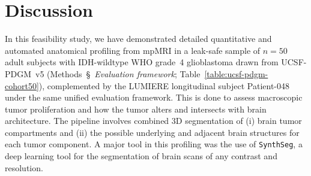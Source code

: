 \documentclass[a4paper,11pt,leqno]{article}
\begin{document}
\vspace{2mm}


\section{Discussion}


In this feasibility study, we have demonstrated detailed quantitative and automated anatomical profiling
from mpMRI in a leak-safe sample of $n=50$ adult subjects with
IDH-wildtype WHO grade~4 glioblastoma drawn from UCSF-PDGM~v5
(Methods~\S~\emph{Evaluation framework};
Table~\ref{table:ucsf-pdgm-cohort50}), complemented by the LUMIERE
longitudinal subject Patient-048 under the same unified evaluation
framework. This is done to assess macroscopic tumor proliferation
and how the tumor alters and intersects with brain architecture. The pipeline involves
combined 3D segmentation of (i) brain tumor compartments and (ii) the
possible underlying and adjacent brain structures for each tumor
component. A major tool in this profiling was the use of \texttt{SynthSeg}, a
deep learning tool for the segmentation of brain scans of any contrast and
resolution.
\end{document}
